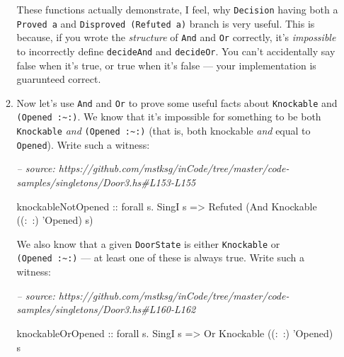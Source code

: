 \documentclass[]{article}
\newenvironment{Shaded}{}{}
\newcommand{\CommentTok}[1]{\textcolor[rgb]{0.38,0.63,0.69}{\textit{#1}}}
\newcommand{\DataTypeTok}[1]{\textcolor[rgb]{0.56,0.13,0.00}{#1}}
\newcommand{\FunctionTok}[1]{\textcolor[rgb]{0.02,0.16,0.49}{#1}}
\newcommand{\NormalTok}[1]{#1}
\newcommand{\OtherTok}[1]{\textcolor[rgb]{0.00,0.44,0.13}{#1}}
\begin{document}
\begin{enumerate}
\begin{enumerate}
    These functions actually demonstrate, I feel, why \texttt{Decision} having
    both a \texttt{Proved\ a} and \texttt{Disproved\ (Refuted\ a)} branch is
    very useful. This is because, if you wrote the \emph{structure} of
    \texttt{And} and \texttt{Or} correctly, it's \emph{impossible} to
    incorrectly define \texttt{decideAnd} and \texttt{decideOr}. You can't
    accidentally say false when it's true, or true when it's false --- your
    implementation is guarunteed correct.
  \item
    Now let's use \texttt{And} and \texttt{Or} to prove some useful facts about
    \texttt{Knockable} and
    \texttt{(\textquotesingle{}Opened\ :\textasciitilde{}:)}. We know that it's
    impossible for something to be both \texttt{Knockable} \emph{and}
    \texttt{(\textquotesingle{}Opened\ :\textasciitilde{}:)} (that is, both
    knockable \emph{and} equal to \texttt{\textquotesingle{}Opened}). Write such
    a witness:

\begin{Shaded}
\begin{Highlighting}[]
\CommentTok{-- source: https://github.com/mstksg/inCode/tree/master/code-samples/singletons/Door3.hs#L153-L155}

\NormalTok{knockableNotOpened}
\OtherTok{    ::}\NormalTok{ forall s}\FunctionTok{.} \DataTypeTok{SingI}\NormalTok{ s}
    \OtherTok{=>} \DataTypeTok{Refuted}\NormalTok{ (}\DataTypeTok{And} \DataTypeTok{Knockable}\NormalTok{ ((}\FunctionTok{:~:}\NormalTok{) '}\DataTypeTok{Opened}\NormalTok{) s)}
\end{Highlighting}
\end{Shaded}

    We also know that a given \texttt{DoorState} is either \texttt{Knockable} or
    \texttt{(\textquotesingle{}Opened\ :\textasciitilde{}:)} --- at least one of
    these is always true. Write such a witness:

\begin{Shaded}
\begin{Highlighting}[]
\CommentTok{-- source: https://github.com/mstksg/inCode/tree/master/code-samples/singletons/Door3.hs#L160-L162}

\NormalTok{knockableOrOpened}
\OtherTok{    ::}\NormalTok{ forall s}\FunctionTok{.} \DataTypeTok{SingI}\NormalTok{ s}
    \OtherTok{=>} \DataTypeTok{Or} \DataTypeTok{Knockable}\NormalTok{ ((}\FunctionTok{:~:}\NormalTok{) '}\DataTypeTok{Opened}\NormalTok{) s}
\end{Highlighting}
\end{Shaded}
  \end{enumerate}


\end{enumerate}
\end{document}
